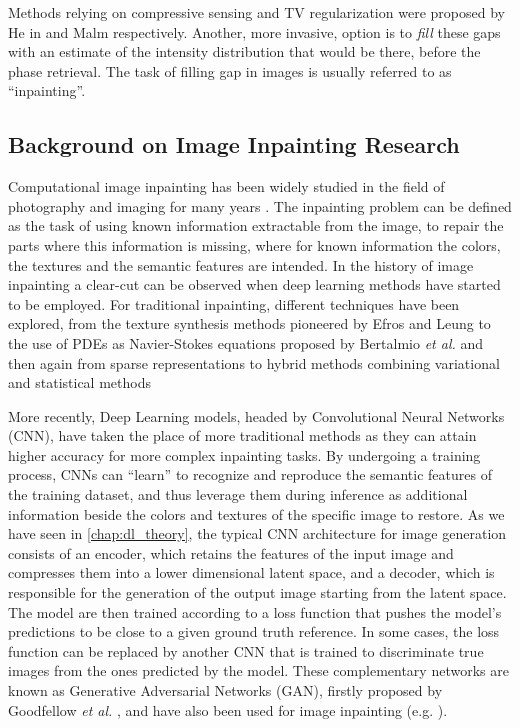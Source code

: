 Methods relying on compressive sensing and TV regularization were proposed by He in \cite{He2015} and Malm 
\cite{Chushkin2025} respectively. Another, more invasive, option is to \textit{fill} these gaps with an estimate of 
the intensity distribution that would be there, before the phase retrieval. The task of filling gap in images is usually 
referred to as ``inpainting''.


\subsection{Background on Image Inpainting Research}
 
Computational image inpainting has been widely studied in the field of photography and imaging for many years \cite{Elharrouss_2019,reviewInpainting2021}. 
The inpainting problem can be defined as the task of using known information extractable from the image, to repair
the parts where this information is missing, where for known information the colors, the textures and the semantic features
are intended. In the history of image inpainting a clear-cut can be observed when deep learning methods have started to be employed.
For traditional inpainting, different techniques have been explored, from the texture synthesis methods pioneered by Efros and 
Leung \cite{Efros1999} to the use of PDEs as Navier-Stokes equations proposed by Bertalmio \textit{et al.} \cite{BertalmioNavierStokes}
and then again from sparse representations \cite{Mairal_sparse} to hybrid methods combining variational and statistical methods \cite{CedricAllene}

More recently, Deep Learning models, headed by Convolutional Neural Networks (CNN), have taken the place of more traditional 
methods as they can attain higher accuracy for more complex inpainting tasks. By undergoing a  
training process, CNNs can ``learn'' to recognize and reproduce the semantic features of the training dataset, and thus
leverage them during inference as additional information beside the colors and textures of the specific image to restore. 
As we have seen in \ref{chap:dl_theory}, the typical CNN architecture for image generation consists of an encoder, which
retains the features of the input image and compresses them into a lower dimensional latent space, and a decoder, which
is responsible for the generation of the output image starting from the latent space. The model are then trained according 
to a loss function that pushes the model's predictions to be close to a given ground truth reference. 
In some cases, the loss function can be replaced by another CNN that is trained to discriminate true images from the ones
predicted by the model. These complementary networks are known as Generative Adversarial Networks (GAN), firstly 
proposed by Goodfellow \textit{et al.} \cite{goodfellow2014generativeadversarialnetworks}, and have also been used for 
image inpainting (e.g. \cite{gan_inpainting}). 

